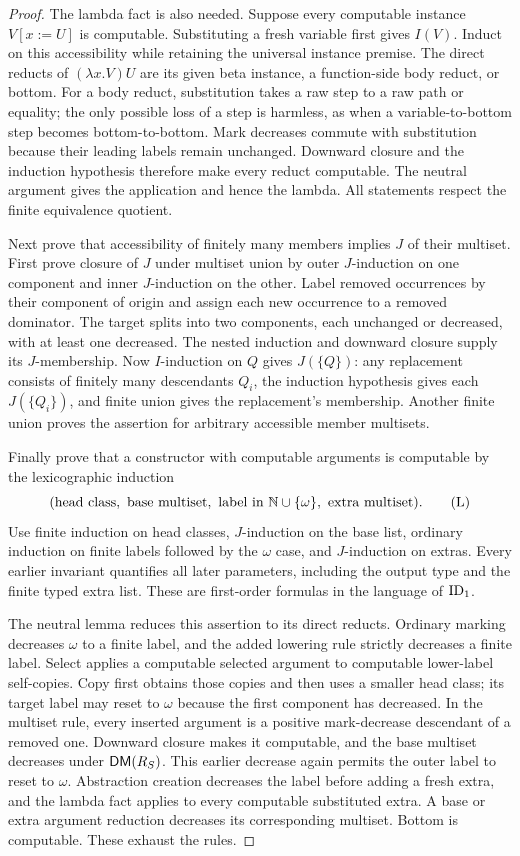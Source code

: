 \begin{proof}
The lambda fact is also needed. Suppose every computable instance
$V[x:=U]$ is computable. Substituting a fresh variable first gives
$I(V)$. Induct on this accessibility while retaining the universal
instance premise. The direct reducts of $(\lambda x.V)U$ are its given
beta instance, a function-side body reduct, or bottom. For a body
reduct, substitution takes a raw step to a raw path or equality; the
only possible loss of a step is harmless, as when a variable-to-bottom
step becomes bottom-to-bottom. Mark decreases commute with substitution
because their leading labels remain unchanged. Downward closure and the
induction hypothesis therefore make every reduct computable. The
neutral argument gives the application and hence the lambda.
All statements respect the finite equivalence quotient.

Next prove that accessibility of finitely many members implies $J$ of
their multiset. First prove closure of $J$ under multiset union by outer
$J$-induction on one component and inner $J$-induction on the other.
Label removed occurrences by their component of origin and assign each
new occurrence to a removed dominator. The target splits into two
components, each unchanged or decreased, with at least one decreased.
The nested induction and downward closure supply its $J$-membership.
Now $I$-induction on $Q$ gives $J(\{Q\})$: any replacement consists of
finitely many descendants $Q_i$, the induction hypothesis gives each
$J(\{Q_i\})$, and finite union gives the replacement's membership.
Another finite union proves the assertion for arbitrary accessible
member multisets.

Finally prove that a constructor with computable arguments is computable
by the lexicographic induction
\[
 (\text{head class},\ \text{base multiset},\
    \text{label in }\mathbb N\cup\{\omega\},\ \text{extra multiset}).
 \tag{L}
\]
Use finite induction on head classes, $J$-induction on the base list,
ordinary induction on finite labels followed by the $\omega$ case,
and $J$-induction on extras. Every earlier invariant quantifies all
later parameters, including the output type and the finite typed extra
list. These are first-order formulas in the language of $\mathrm{ID}_1$.

The neutral lemma reduces this assertion to its direct reducts.
Ordinary marking decreases $\omega$ to a finite label, and the added
lowering rule strictly decreases a finite label. Select applies a
computable selected argument to computable lower-label self-copies.
Copy first obtains those copies and then uses a smaller head class;
its target label may reset to $\omega$ because the first component
has decreased. In the multiset rule, every inserted argument is a
positive mark-decrease descendant of a removed one. Downward closure
makes it computable, and the base multiset decreases under $\mathsf{DM}(R_S)$.
This earlier decrease again permits the outer label to reset to
$\omega$. Abstraction creation decreases the label before adding a
fresh extra, and the lambda fact applies to every computable
substituted extra. A base or extra argument reduction decreases its
corresponding multiset. Bottom is computable. These exhaust the rules.


\end{proof}
